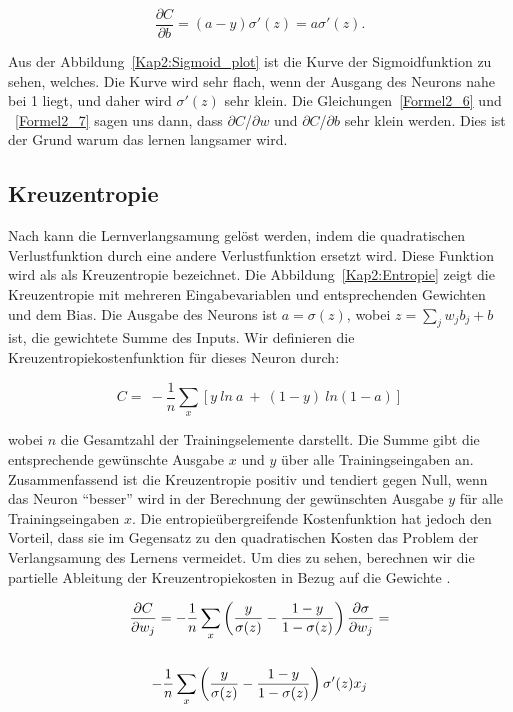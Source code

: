     \begin{equation} \label{Formel2_7}
      \frac{\partial C}{\partial b} =( a-y) \sigma '( z) =a\sigma '( z).
    \end{equation}

    Aus der Abbildung~\ref{Kap2:Sigmoid_plot} ist die Kurve der Sigmoidfunktion zu sehen, welches. Die Kurve wird sehr flach, wenn der Ausgang des Neurons nahe bei 1 liegt, und daher wird $\sigma'(z)$ sehr klein. Die Gleichungen~\ref{Formel2_6} und ~\ref{Formel2_7} sagen uns dann, dass $\partial$$C$/$\partial$$w$  und  $\partial$$C$/$\partial$$b$ sehr klein werden. Dies ist der Grund warum das lernen langsamer wird.

  \subsection{Kreuzentropie}
  Nach \cite*[62]{Nielsen2015} kann die Lernverlangsamung gelöst werden, indem die quadratischen Verlustfunktion durch eine andere Verlustfunktion ersetzt wird. Diese Funktion wird als als Kreuzentropie bezeichnet. Die Abbildung~\ref{Kap2:Entropie} zeigt die Kreuzentropie mit mehreren Eingabevariablen und entsprechenden Gewichten und dem Bias. Die Ausgabe des Neurons ist $a = \sigma(z)$, wobei $z =  \sum _{j} w_{j} b_{j} + b$ ist, die gewichtete Summe des Inputs. Wir definieren die Kreuzentropiekostenfunktion für dieses Neuron durch:

  \begin{equation} \label{Formel2_8}
    C=\ -\frac{1}{n}\sum _{x}[ y\ ln\ a\ +\ ( 1-y) \ ln( 1-a)]
  \end{equation}

  wobei $n$ die Gesamtzahl der Trainingselemente darstellt. Die Summe gibt die entsprechende gewünschte Ausgabe $x$ und $y$ über alle Trainingseingaben an. Zusammenfassend ist die Kreuzentropie positiv und tendiert gegen Null, wenn das Neuron
  \enquote{besser} wird in der Berechnung der gewünschten Ausgabe $y$ für alle Trainingseingaben $x$.  Die entropieübergreifende Kostenfunktion hat jedoch den Vorteil, dass sie im Gegensatz zu den quadratischen Kosten das Problem der Verlangsamung des Lernens vermeidet. Um dies zu sehen, berechnen wir die partielle Ableitung der Kreuzentropiekosten in Bezug auf die Gewichte \cite*[63]{Nielsen2015}.

  \begin{gather} \label{Formel2_9}
    \frac{\partial C}{\partial w_{j}} =-\frac{1}{n}\sum _{x}\left(\frac{y}{\sigma ( z)} -\frac{1-y}{1-\sigma ( z)}\right)\frac{\partial \sigma }{\partial w_{j}} = \notag\\
    \notag\\
    -\frac{1}{n}\sum _{x}\left(\frac{y}{\sigma ( z)} -\frac{1-y}{1-\sigma ( z)}\right) \sigma '( z) x_{j} \notag\\
  \end{gather}

